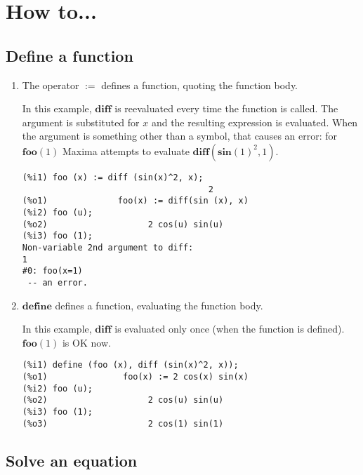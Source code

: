 \documentclass[12pt]{article}
\begin{document}
\section{How to...}

\subsection{Define a function}

\begin{enumerate}

\item The operator $\mathbf{:=}$ defines a function, quoting the function body.

In this example, $\mathbf{diff}$ is reevaluated every time the function is called.
The argument is substituted for $x$ and the resulting expression is evaluated.
When the argument is something other than a symbol, that causes an error:
for $\mathbf{foo} (1)$ Maxima attempts to evaluate $\mathbf{diff} (\mathbf{sin}(1)^2, 1)$.

\begin{verbatim}
(%i1) foo (x) := diff (sin(x)^2, x);
                                     2
(%o1)              foo(x) := diff(sin (x), x)
(%i2) foo (u);
(%o2)                    2 cos(u) sin(u)
(%i3) foo (1);
Non-variable 2nd argument to diff:
1
#0: foo(x=1)
 -- an error.
\end{verbatim}

\item $\mathbf{define}$ defines a function, evaluating the function body.

In this example, $\mathbf{diff}$ is evaluated only once (when the function is defined).
$\mathbf{foo} (1)$ is OK now.

\begin{verbatim}
(%i1) define (foo (x), diff (sin(x)^2, x));
(%o1)               foo(x) := 2 cos(x) sin(x)
(%i2) foo (u);
(%o2)                    2 cos(u) sin(u)
(%i3) foo (1);
(%o3)                    2 cos(1) sin(1)
\end{verbatim}

\end{enumerate}

\subsection{Solve an equation}
\end{document}
